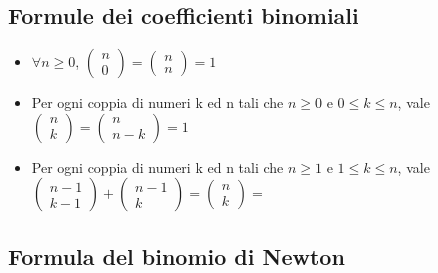 \documentclass[a4paper, 10pt]{article}
\begin{document}
\subsection{Formule dei coefficienti binomiali}
\begin{itemize}
	\item $\forall n \geq 0$, $\begin{pmatrix}
		n \\
		0 
	\end{pmatrix}=\begin{pmatrix}
	n \\
	n 
	\end{pmatrix}=1$
	\item Per ogni coppia di numeri k ed n tali che $n \geq 0$ e $0 \leq k \leq n$, vale $\begin{pmatrix}
		n \\
		k 
	\end{pmatrix}=\begin{pmatrix}
		n \\
		n - k
	\end{pmatrix}=1$
	\item Per ogni coppia di numeri k ed n tali che $n \geq 1$ e $1 \leq k \leq n$, vale $\begin{pmatrix}
		n - 1\\
		k - 1
	\end{pmatrix} + \begin{pmatrix}
		n - 1 \\
		k
	\end{pmatrix}=\begin{pmatrix}
	n \\
	k
	\end{pmatrix}=$
\end{itemize}

\subsection{Formula del binomio di Newton}
\end{document}

